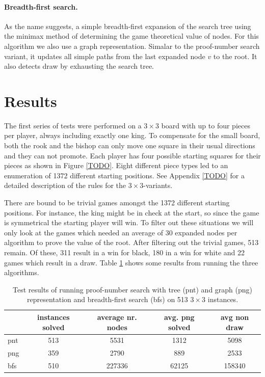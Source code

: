 \documentclass{article}
\begin{document}
\paragraph{Breadth-first search.} As the name suggests, a simple breadth-first expansion of the search tree using the minimax method of determining
the game theoretical value of nodes. For this algorithm we also use a graph representation. Simalar to the proof-number search variant, it
updates all simple paths from the last expanded node $v$ to the root. It also detects draw by exhausting the search tree.

\section{Results}
The first series of tests were performed on a $3 \times 3$ board with up to four pieces per player, always including exactly one king. To compensate
for the small board, both the rook and the bishop can only move one square in their usual directions and they can not promote. Each player
has four possible starting squares for their pieces as shown in Figure \ref{TODO}.
Eight different piece types led to an enumeration of 1372 different starting positions.
See Appendix \ref{TODO} for a detailed description of the rules for the $3 \times 3$-variants.

There are bound to be trivial games amongst the 1372 different starting positions. For instance, the king might be in check at the start, so since
the game is symmetrical the starting player will win. To filter out these situations we will only look at the games which needed an
average of 30 expanded nodes per algorithm to prove the value of the root. After filtering out the trivial games, 513 remain. Of these, 311 result
in a win for black, 180 in a win for white and 22 games which result in a draw. Table \ref{table:3x3result} shows some results from running the three
algorithms.

\begin{table}[h]
\begin{tabular}{l | c | c | c | c}
 & instances solved & average nr. nodes & avg. png solved & avg non draw \\ \hline
pnt & 513 & 5531 & 1312 & 5098\\
png & 359 & 2790 & 889 & 2533\\
bfs & 510 & 227336 & 62125 & 158340\\
\end{tabular}
\label{table:3x3result}
\caption{Test results of running proof-number search with tree (pnt) and graph (png) representation and breadth-first search (bfs) on 513 $3 \times 3$
instances.}
\end{table}
\end{document}
